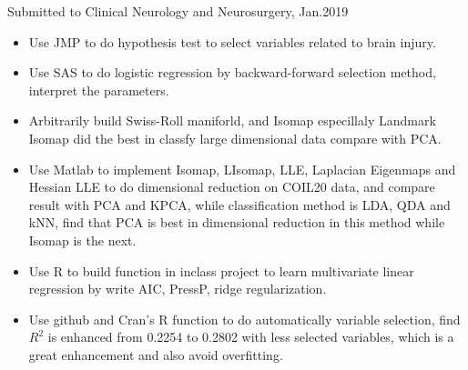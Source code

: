 \documentclass{resume}
\begin{document}
Submitted to Clinical Neurology and Neurosurgery, Jan.2019
\begin{itemize}
   \item Use JMP to do hypothesis test to select variables related to brain injury.
  \item Use SAS to do logistic regression by backward-forward selection method, interpret the parameters.
\end{itemize}

\begin{itemize}
  \item Arbitrarily build Swiss-Roll maniforld, and Isomap especillaly Landmark Isomap did the best in classfy large dimensional data compare with PCA.
  \item Use Matlab to implement Isomap, LIsomap, LLE, Laplacian Eigenmaps and Hessian LLE to do dimensional reduction on COIL20 data, and compare result with PCA and KPCA, while classification method is LDA, QDA and kNN, find that PCA is best in dimensional reduction in this method while Isomap is the next.  
  
\end{itemize}

\begin{itemize}
  \item Use R to build function in inclass project to learn multivariate linear regression by write AIC, PressP, ridge  regularization. 
  \item Use github and Cran's R function to do automatically variable selection, find $R^{2}$ is enhanced from 0.2254 to 0.2802 with less selected variables, which is a great enhancement and also avoid overfitting.
\end{itemize}



%
%
\end{document}
